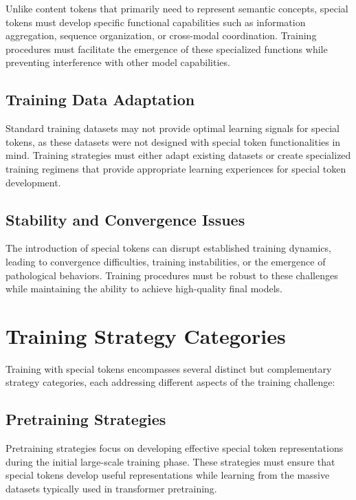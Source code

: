 Unlike content tokens that primarily need to represent semantic concepts, special tokens must develop specific functional capabilities such as information aggregation, sequence organization, or cross-modal coordination. Training procedures must facilitate the emergence of these specialized functions while preventing interference with other model capabilities.

\subsection{Training Data Adaptation}

Standard training datasets may not provide optimal learning signals for special tokens, as these datasets were not designed with special token functionalities in mind. Training strategies must either adapt existing datasets or create specialized training regimens that provide appropriate learning experiences for special token development.

\subsection{Stability and Convergence Issues}

The introduction of special tokens can disrupt established training dynamics, leading to convergence difficulties, training instabilities, or the emergence of pathological behaviors. Training procedures must be robust to these challenges while maintaining the ability to achieve high-quality final models.

\section{Training Strategy Categories}

Training with special tokens encompasses several distinct but complementary strategy categories, each addressing different aspects of the training challenge:

\subsection{Pretraining Strategies}

Pretraining strategies focus on developing effective special token representations during the initial large-scale training phase. These strategies must ensure that special tokens develop useful representations while learning from the massive datasets typically used in transformer pretraining.

